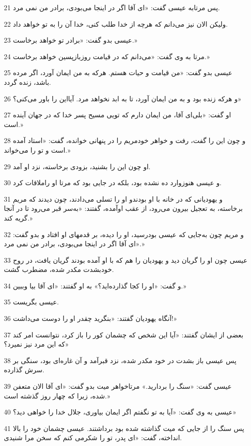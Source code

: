 \par 21 پس مرتابه عیسی گفت: «ای آقا اگر در اینجا می‌بودی، برادر من نمی مرد.
\par 22 ولیکن الان نیز می‌دانم که هرچه از خدا طلب کنی، خدا آن را به تو خواهد داد.
\par 23 عیسی بدو گفت: «برادر تو خواهد برخاست.»
\par 24 مرتا به وی گفت: «می‌دانم که در قیامت روزبازپسین خواهد برخاست.»
\par 25 عیسی بدو گفت: «من قیامت و حیات هستم. هر‌که به من ایمان آورد، اگر مرده باشد، زنده گردد.
\par 26 و هر‌که زنده بود و به من ایمان آورد، تا به ابد نخواهد مرد. آیااین را باور می‌کنی؟»
\par 27 او گفت: «بلی‌ای آقا، من ایمان دارم که تویی مسیح پسر خدا که در جهان آینده است.»
\par 28 و چون این را گفت، رفت و خواهر خودمریم را در پنهانی خوانده، گفت: «استاد آمده است و تو را می‌خواند.»
\par 29 او چون این را بشنید، بزودی برخاسته، نزد او آمد.
\par 30 و عیسی هنوزوارد ده نشده بود، بلکه در جایی بود که مرتا او راملاقات کرد.
\par 31 و یهودیانی که در خانه با او بودندو او را تسلی می‌دادند، چون دیدند که مریم برخاسته، به تعجیل بیرون می‌رود، از عقب اوآمده، گفتند: «به‌سر قبر می‌رود تا در آنجا گریه کند.»
\par 32 و مریم چون به‌جایی که عیسی بودرسید، او را دیده، بر قدمهای او افتاد و بدو گفت: «ای آقا اگر در اینجا می‌بودی، برادر من نمی مرد.»
\par 33 عیسی چون او را گریان دید و یهودیان را هم که با او آمده بودند گریان یافت، در روح خودبشدت مکدر شده، مضطرب گشت.
\par 34 و گفت: «او را کجا گذارده‌اید؟» به او گفتند: «ای آقا بیا وببین.»
\par 35 عیسی بگریست.
\par 36 آنگاه یهودیان گفتند: «بنگرید چقدر او را دوست می‌داشت!»
\par 37 بعضی از ایشان گفتند: «آیا این شخص که چشمان کور را باز کرد، نتوانست امر کند که این مرد نیز نمیرد؟»
\par 38 پس عیسی باز بشدت در خود مکدر شده، نزد قبر‌آمد و آن غاره‌ای بود، سنگی بر سرش گذارده.
\par 39 عیسی گفت: «سنگ را بردارید.» مرتاخواهر میت بدو گفت: «ای آقا الان متعفن شده، زیرا که چهار روز گذشته است.»
\par 40 عیسی به وی گفت: «آیا به تو نگفتم اگر ایمان بیاوری، جلال خدا را خواهی دید؟»
\par 41 پس سنگ را از جایی که میت گذاشته شده بود برداشتند. عیسی چشمان خود را بالا انداخته، گفت: «ای پدر، تو را شکرمی کنم که سخن مرا شنیدی.

